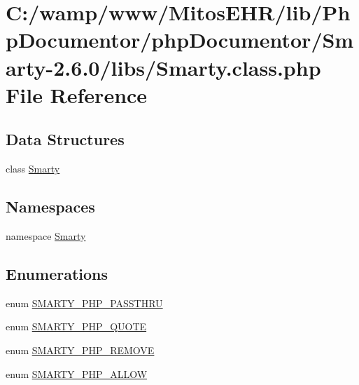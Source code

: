 \hypertarget{_smarty_8class_8php}{\section{\-C\-:/wamp/www/\-Mitos\-E\-H\-R/lib/\-Php\-Documentor/php\-Documentor/\-Smarty-\/2.6.0/libs/\-Smarty.class.\-php \-File \-Reference}
\label{_smarty_8class_8php}
}
\subsection*{\-Data \-Structures}
\begin{DoxyCompactItemize}
\item 
class \hyperlink{class_smarty}{\-Smarty}
\end{DoxyCompactItemize}
\subsection*{\-Namespaces}
\begin{DoxyCompactItemize}
\item 
namespace \hyperlink{namespace_smarty}{\-Smarty}
\end{DoxyCompactItemize}
\subsection*{\-Enumerations}
\begin{DoxyCompactItemize}
\item 
enum \hyperlink{_smarty_8class_8php_ae3b4c1abf166f5bc090b8ffd8b7b986e}{\-S\-M\-A\-R\-T\-Y\-\_\-\-P\-H\-P\-\_\-\-P\-A\-S\-S\-T\-H\-R\-U} 
\item 
enum \hyperlink{_smarty_8class_8php_a44cc0679267a6e4f6cf041fdee4fd20f}{\-S\-M\-A\-R\-T\-Y\-\_\-\-P\-H\-P\-\_\-\-Q\-U\-O\-T\-E} 
\item 
enum \hyperlink{_smarty_8class_8php_a6c00e5b0b19dcce58b112720301d618a}{\-S\-M\-A\-R\-T\-Y\-\_\-\-P\-H\-P\-\_\-\-R\-E\-M\-O\-V\-E} 
\item 
enum \hyperlink{_smarty_8class_8php_a1c2937c2d2161c312c415cae094b300d}{\-S\-M\-A\-R\-T\-Y\-\_\-\-P\-H\-P\-\_\-\-A\-L\-L\-O\-W} 
\end{DoxyCompactItemize}



